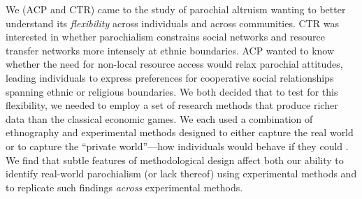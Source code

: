 \documentclass[bibauthoryear]{aa}
\begin{document}
We (ACP and CTR) came to the study of parochial altruism wanting to better understand its \textit{flexibility} across individuals and across communities. CTR was interested in whether parochialism constrains social networks and resource transfer networks more intensely at ethnic boundaries. ACP wanted to know whether the need for non-local resource access would relax parochial attitudes, leading individuals to express preferences for cooperative social relationships spanning ethnic or religious boundaries. We both decided that to test for this flexibility, we needed  to employ a set of research methods that produce richer data than the classical economic games. We each used a combination of ethnography and experimental %
 methods designed to either capture the real world  or to capture the ``private world''---how individuals would behave if they could \citep{Pisor2020}. %
We find that subtle features of methodological design affect both our ability to identify real-world parochialism (or lack thereof) using experimental methods and to replicate such findings  \textit{across} experimental methods.  %
\end{document}
